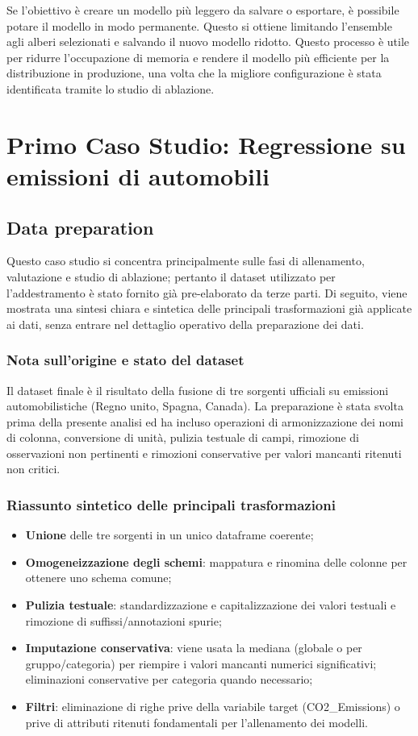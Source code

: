 \documentclass[a4paper,12pt]{report}
\begin{document}
	Se l'obiettivo è creare un modello più leggero da salvare o esportare, è possibile potare il modello in modo permanente. Questo si ottiene limitando l'ensemble agli alberi selezionati e salvando il nuovo modello ridotto. Questo processo è utile per ridurre l'occupazione di memoria e rendere il modello più efficiente per la distribuzione in produzione, una volta che la migliore configurazione è stata identificata tramite lo studio di ablazione.
	
	\chapter{Primo Caso Studio: Regressione su emissioni di automobili}
	
	\section{Data preparation}
	
	Questo caso studio si concentra principalmente sulle fasi di allenamento, valutazione e studio di ablazione; pertanto il dataset utilizzato per l'addestramento è stato fornito già pre-elaborato da terze parti. Di seguito, viene mostrata una sintesi chiara e sintetica delle principali trasformazioni già applicate ai dati, senza entrare nel dettaglio operativo della preparazione dei dati.
	
	\subsection{Nota sull'origine e stato del dataset}
	Il dataset finale è il risultato della fusione di tre sorgenti ufficiali su emissioni automobilistiche (Regno unito, Spagna, Canada). La preparazione è stata svolta prima della presente analisi ed ha incluso operazioni di armonizzazione dei nomi di colonna, conversione di unità, pulizia testuale di campi, rimozione di osservazioni non pertinenti e rimozioni conservative per valori mancanti ritenuti non critici.
	
	\subsection{Riassunto sintetico delle principali trasformazioni}
	\begin{itemize}
		\item \textbf{Unione} delle tre sorgenti in un unico dataframe coerente;
		\item \textbf{Omogeneizzazione degli schemi}: mappatura e rinomina delle colonne per ottenere uno schema comune;
		\item \textbf{Pulizia testuale}: standardizzazione e capitalizzazione dei valori testuali e rimozione di suffissi/annotazioni spurie;
		\item \textbf{Imputazione conservativa}: viene usata la mediana (globale o per gruppo/categoria) per riempire i valori mancanti numerici significativi; eliminazioni conservative per categoria quando necessario;
		\item \textbf{Filtri}: eliminazione di righe prive della variabile target (CO2\_Emissions) o prive di attributi ritenuti fondamentali per l'allenamento dei modelli.
	\end{itemize}
	
\end{document}
